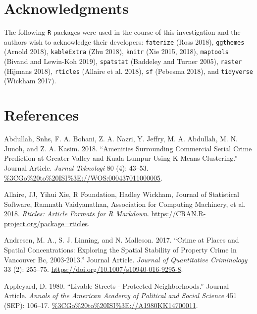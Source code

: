 \documentclass[smallextended]{svjour3}       %
\begin{document}
\hypertarget{acknowledgments}{%
\section{Acknowledgments}\label{acknowledgments}}

The following \texttt{R} packages were used in the course of this
investigation and the authors wish to acknowledge their developers:
\texttt{faterize} (Ross 2018), \texttt{ggthemes} (Arnold 2018),
\texttt{kableExtra} (Zhu 2018), \texttt{knitr} (Xie 2015, 2018),
\texttt{maptools} (Bivand and Lewin-Koh 2019), \texttt{spatstat}
(Baddeley and Turner 2005), \texttt{raster} (Hijmans 2018),
\texttt{rticles} (Allaire et al. 2018), \texttt{sf} (Pebesma 2018), and
\texttt{tidyverse} (Wickham 2017).

\hypertarget{references}{%
\section*{References}\label{references}}

\hypertarget{refs}{}
\leavevmode\hypertarget{ref-Abdullah2018amenities}{}%
Abdullah, Snhs, F. A. Bohani, Z. A. Nazri, Y. Jeffry, M. A. Abdullah, M.
N. Junoh, and Z. A. Kasim. 2018. ``Amenities Surrounding Commercial
Serial Crime Prediction at Greater Valley and Kuala Lumpur Using K-Means
Clustering.'' Journal Article. \emph{Jurnal Teknologi} 80 (4): 43--53.
\url{\%3CGo\%20to\%20ISI\%3E://WOS:000437011000005}.

\leavevmode\hypertarget{ref-Allaire2018rticles}{}%
Allaire, JJ, Yihui Xie, R Foundation, Hadley Wickham, Journal of
Statistical Software, Ramnath Vaidyanathan, Association for Computing
Machinery, et al. 2018. \emph{Rticles: Article Formats for R Markdown}.
\url{https://CRAN.R-project.org/package=rticles}.

\leavevmode\hypertarget{ref-Andresen2017crime}{}%
Andresen, M. A., S. J. Linning, and N. Malleson. 2017. ``Crime at Places
and Spatial Concentrations: Exploring the Spatial Stability of Property
Crime in Vancouver Bc, 2003-2013.'' Journal Article. \emph{Journal of
Quantitative Criminology} 33 (2): 255--75.
\url{https://doi.org/10.1007/s10940-016-9295-8}.

\leavevmode\hypertarget{ref-Appleyard1980livable}{}%
Appleyard, D. 1980. ``Livable Streets - Protected Neighborhoods.''
Journal Article. \emph{Annals of the American Academy of Political and
Social Science} 451 (SEP): 106--17.
\url{\%3CGo\%20to\%20ISI\%3E://A1980KK14700011}.
\end{document}
